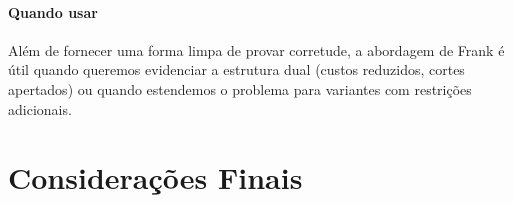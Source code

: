 \documentclass[12pt,a4paper]{article}
\begin{document}
\paragraph{Quando usar}
Além de fornecer uma forma limpa de provar corretude, a abordagem de Frank é útil quando queremos evidenciar a estrutura dual (custos reduzidos, cortes apertados) ou quando estendemos o problema para variantes com restrições adicionais.
    
\section{Considerações Finais}
\printbibliography
\end{document}
